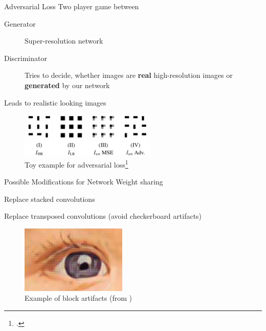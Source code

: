 \documentclass{beamer}
\begin{document}
\begin{frame}{Adversarial Loss}
  Two player game between
  \begin{description}
  \item[Generator] Super-resolution network
  \item[Discriminator] Tries to decide, whether images are \textbf{real} high-resolution images or \textbf{generated} by our network
  \end{description}

  Leads to realistic looking images
\begin{figure}[h]
    \centering
    \includegraphics[width=0.58\textwidth]{adversarial_loss}
    \caption*{Toy example for adversarial loss\footcite{EnhanceNet}}
  \end{figure}
\end{frame}

\begin{frame}{Possible Modifications for Network}
  Weight sharing

  Replace stacked convolutions

  Replace transposed convolutions (avoid checkerboard artifacts)

  \begin{figure}[h]
    \centering
    \includegraphics[width=0.45\textwidth]{perceptual_loss_vgg}
    \caption*{Example of block artifacts (from )}
  \end{figure}
\end{frame}
\end{document}
